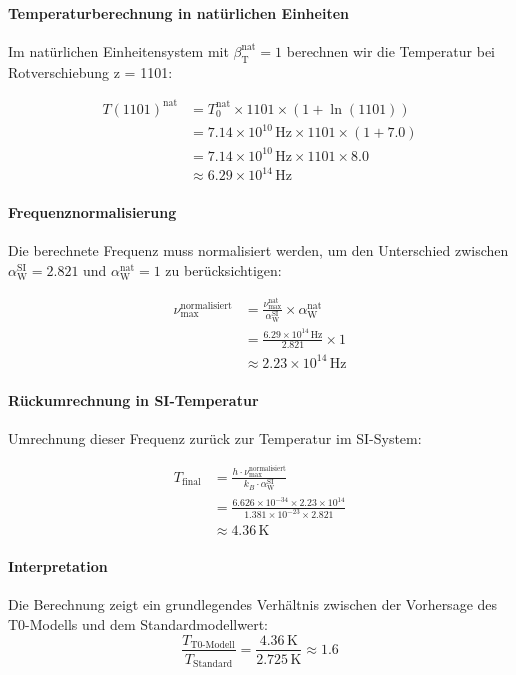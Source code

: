 \documentclass[12pt,a4paper]{article}
\newcommand{\betaT}{\beta_{\text{T}}}
\newcommand{\alphaW}{\alpha_{\text{W}}}
\begin{document}
	\paragraph{Temperaturberechnung in natürlichen Einheiten}
	Im natürlichen Einheitensystem mit \(\betaT^{\text{nat}} = 1\) berechnen wir die Temperatur bei Rotverschiebung z = 1101:
	
	\begin{align}
		T(1101)^{\text{nat}} &= T_0^{\text{nat}} \times 1101 \times (1 + \ln(1101)) \\
		&= 7.14 \times 10^{10} \, \text{Hz} \times 1101 \times (1 + 7.0) \\
		&= 7.14 \times 10^{10} \, \text{Hz} \times 1101 \times 8.0 \\
		&\approx 6.29 \times 10^{14} \, \text{Hz}
	\end{align}
	
	\paragraph{Frequenznormalisierung}
	Die berechnete Frequenz muss normalisiert werden, um den Unterschied zwischen \(\alphaW^{\text{SI}} = 2.821\) und \(\alphaW^{\text{nat}} = 1\) zu berücksichtigen:
	
	\begin{align}
		\nu_{\text{max}}^{\text{normalisiert}} &= \frac{\nu_{\text{max}}^{\text{nat}}}{\alphaW^{\text{SI}}} \times \alphaW^{\text{nat}} \\
		&= \frac{6.29 \times 10^{14} \, \text{Hz}}{2.821} \times 1 \\
		&\approx 2.23 \times 10^{14} \, \text{Hz}
	\end{align}
	
	\paragraph{Rückumrechnung in SI-Temperatur}
	Umrechnung dieser Frequenz zurück zur Temperatur im SI-System:
	
	\begin{align}
		T_{\text{final}} &= \frac{h \cdot \nu_{\text{max}}^{\text{normalisiert}}}{k_B \cdot \alphaW^{\text{SI}}} \\
		&= \frac{6.626 \times 10^{-34} \times 2.23 \times 10^{14}}{1.381 \times 10^{-23} \times 2.821} \\
		&\approx 4.36 \, \text{K}
	\end{align}
	
	\paragraph{Interpretation}
	Die Berechnung zeigt ein grundlegendes Verhältnis zwischen der Vorhersage des T0-Modells und dem Standardmodellwert:
	\begin{equation}
		\frac{T_{\text{T0-Modell}}}{T_{\text{Standard}}} = \frac{4.36 \, \text{K}}{2.725 \, \text{K}} \approx 1.6
	\end{equation}
	
\end{document}
